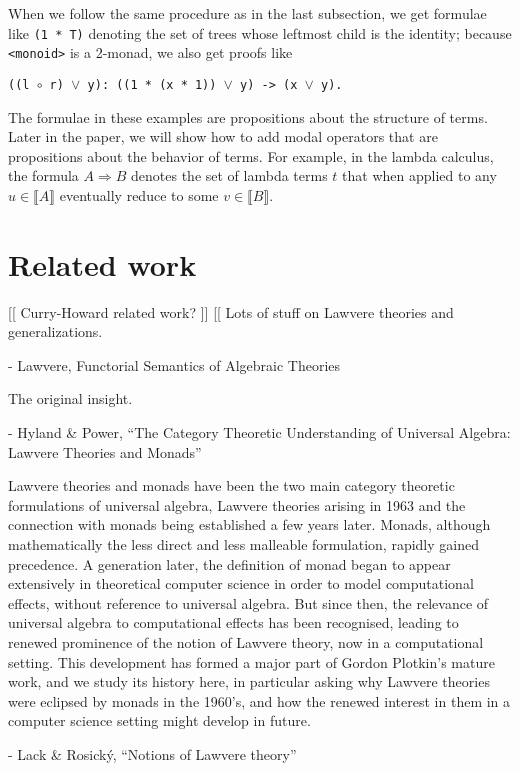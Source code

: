 \documentclass{article}
\newcommand{\interp}[1]{\llbracket #1 \rrbracket}
\begin{document}
When we follow the same procedure as in the last subsection, we get formulae like {\tt (1 * T)} denoting the set of trees whose leftmost child is the identity; because {\tt <monoid>} is a 2-monad, we also get proofs like 
\begin{center}
  \tt ((l $\circ$ r) $\lor$ y): ((1 * (x * 1)) $\lor$ y) -> (x $\lor$ y).
\end{center}

The formulae in these examples are propositions about the structure of terms.  Later in the paper, we will show how to add modal operators that are propositions about the behavior of terms.  For example, in the lambda calculus, the formula ${A \Rightarrow B}$ denotes the set of lambda terms $t$ that when applied to any $u \in \interp{A}$ eventually reduce to some $v \in \interp{B}.$

\section{Related work}
[[ Curry-Howard related work? ]]
[[ Lots of stuff on Lawvere theories and generalizations.  

- Lawvere, Functorial Semantics of Algebraic Theories

The original insight.

- Hyland \& Power, ``The Category Theoretic Understanding of Universal Algebra: Lawvere Theories and Monads''

  Lawvere theories and monads have been the two main category theoretic formulations of universal algebra, Lawvere theories arising in 1963 and the connection with monads being established a few years later. Monads, although mathematically the less direct and less malleable formulation, rapidly gained precedence. A generation later, the definition of monad began to appear extensively in theoretical computer science in order to model computational effects, without reference to universal algebra. But since then, the relevance of universal algebra to computational effects has been recognised, leading to renewed prominence of the notion of Lawvere theory, now in a computational setting. This development has formed a major part of Gordon Plotkin’s mature work, and we study its history here, in particular asking why Lawvere theories were eclipsed by monads in the 1960’s, and how the renewed interest in them in a computer science setting might develop in future.

- Lack \& Rosick\'y, ``Notions of Lawvere theory''
\end{document}
